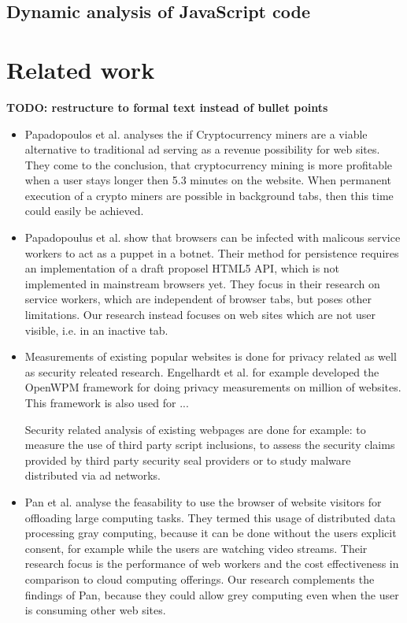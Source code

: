 \documentclass[
	ruledheaders=section,%
	class=report,%
	thesis={type=bachelor},%
	accentcolor=9c,%
	custommargins=true,%
	marginpar=false,%
	parskip=half-,%
	fontsize=11pt,%
]{tudapub}
\begin{document}
  \section{Dynamic analysis of JavaScript code}

  

  
  \newpage
  \chapter{Related work}

  \textbf{TODO: restructure to formal text instead of bullet points}

  \begin{itemize}

  \item Papadopoulos et al.\autocite{papadopoulos2018truth} analyses the if Cryptocurrency miners are a viable alternative to traditional ad serving as a revenue possibility for web sites. They come to the conclusion, that cryptocurrency mining is more profitable when a user stays longer then 5.3 minutes on the website. When permanent execution of a crypto miners are possible in background tabs, then this time could easily be achieved.

  \item Papadopoulus et al.\cite{papadopoulos2018master} show that browsers can be infected with malicous service workers to act as a puppet in a botnet. Their method for persistence requires an implementation of a draft proposel HTML5 API, which is not implemented in mainstream browsers yet. They focus in their research on service workers, which are independent of browser tabs, but poses other limitations. Our research instead focuses on web sites which are not user visible, i.e. in an inactive tab.   

    
  \item Measurements of existing popular websites is done for privacy related as well as security releated research. Engelhardt et al.\cite{englehardt2016online} for example developed the OpenWPM framework for doing privacy measurements on million of websites. This framework is also used for ...

    Security related analysis of existing webpages are done for example: to measure the use of third party script inclusions\cite{nikiforakis2012you}, to assess the security claims provided by third party security seal providers\cite{van2014clubbing} or to study malware distributed via ad networks\cite{zarras2014dark}.


  \item Pan et al. analyse the feasability to use the browser of website visitors for offloading large computing tasks\cite{pan2015gray}. They termed this usage of distributed data processing gray computing, because it can be done without the users explicit consent, for example while the users are watching video streams. Their research focus is the performance of web workers and the cost effectiveness in comparison to cloud computing offerings. Our research complements the findings of Pan, because they could allow grey computing even when the user is consuming other web sites.

    
  \end{itemize}
\end{document}
